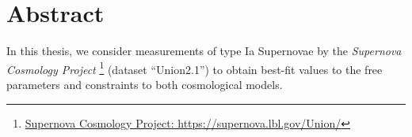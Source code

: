 \chapter*{Abstract}
\thispagestyle{empty}




\noindent In this thesis, we consider measurements of type Ia Supernovae by the \textit{Supernova Cosmology Project} \footnote{\href{https://supernova.lbl.gov/Union/}{Supernova Cosmology Project: https://supernova.lbl.gov/Union/}} (dataset ``Union2.1'') to obtain best-fit values to the free parameters and constraints to both cosmological models.
